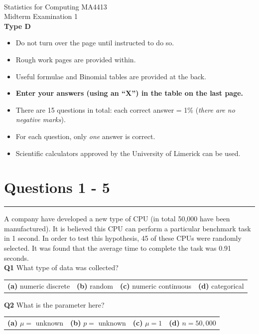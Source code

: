 \documentclass[12pt]{article}
\begin{document}
\quad\\[2cm]

\begin{center}
{\Huge Statistics for Computing MA4413\\[0.8cm]
Midterm Examination 1\\[1cm]
{\bf Type D}}\\[2cm]
\end{center}

\begin{itemize}\itemsep0.6cm
\item Do not turn over the page until instructed to do so.
\item Rough work pages are provided within.
\item Useful formulae and Binomial tables are provided at the back.
\item {\bf Enter your answers (using an ``X'') in the table on the last page.}
\item There are 15 questions in total: each correct answer = 1\% (\emph{there are no negative marks}).
\item For each question, only \emph{one} answer is correct.
\item Scientific calculators approved by the University of Limerick can be used.
\end{itemize}

\newpage
\section*{Questions 1 - 5}

\rule{\linewidth}{1pt}
\quad

A company have developed a new type of CPU (in total 50,000 have been manufactured). It is believed this CPU can perform a particular benchmark task in 1 second. In order to test this hypothesis, 45 of these CPUs were randomly selected. It was found that the average time to complete the task was 0.91 seconds.\\[0.3cm]

{\bf Q1} What type of data was collected?\\[0.2cm]
\begin{tabular}{cccc}
{\bf(a)} numeric discrete & {\bf(b)} random & {\bf(c)} numeric continuous & {\bf(d)} categorical \\[0.6cm]
\end{tabular}

{\bf Q2} What is the parameter here?\\[0.2cm]
\begin{tabular}{cccc}
{\bf(a)} $\mu =$ unknown & {\bf(b)} $p =$ unknown & {\bf(c)} $\mu = 1$ & {\bf(d)} $n = 50,000$ \\[0.6cm]
\end{tabular}
\end{document}
